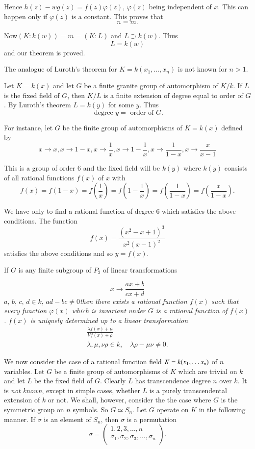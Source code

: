 Hence $h(z) - w g(z) =f(z) \varphi(z)$, $\varphi(z)$ being independent
of $x$. This can happen only if $\varphi(z)$ is a constant. This
proves that  
$$
n=m.
$$

Now\pageoriginale $(K:k(w))=m=(K:L)$ and $L \supset k(w)$. Thus 
$$
L = k(w)
$$
and our theorem is proved.

The analogue of Luroth's theorem for $K=k(x_1, \ldots, x_n)$ is not
known for $n >1$. 

Let $K=k(x)$ and let $G$ be a finite granite group of automorphism of
$K/k$. If $L$ is the fixed field of $G$, then $K/L$ is a finite
extension of degree equal to order of $G$. By Luroth's theorem $L=k(y)$
for some $y$. Thus 
$$
\text{ degree } y = \text{ order of } G.
$$

For instance, let $G$ be the finite group of automorphisms of $K=
k(x)$ defined by  
$$
x \to x, x\to 1-x,x \to \frac{1}{x}, x \to 1-\frac{1}{x},x \to
\frac{1}{1-x},x\to \frac{x}{x-1} 
$$

This is a group of order 6 and the fixed field will be $k(y)$ where
$k(y)$ consists of all rational functions $f(x)$ of $x$ with  
$$
f(x)= f(1-x)= f(\frac{1}{x}) = f(1-\frac{1}{x}) = f(\frac{1}{1-x}) =
f(\frac{x}{1-x}). 
$$

We have only to find a rational function of degree 6 which satisfies
the above conditions. The function  
$$
f(x)= \frac{(x^2-x+1)^3}{x^2(x-1)^2}
$$
satisfies the above conditions and so $y=f(x)$.

\begin{thm}\label{c3:thm14}%
If $G$ is any finite subgroup of $P_2$ of linear transformations 
\end{thm}
$$
x \to \frac{ax+b}{cx+d}
$$
$a$, $b$, $c$, $d \in k $, $ad - bc \neq 0$\pageoriginale \textit{then
  there exists a rational function $f(x)$ such that every function
  $\varphi(x)$ which is invariant under $G$ is a rational function
  of $f(x)$. $f(x)$ is uniquely determined up to a linear
  transformation}  
\begin{gather*}
\frac{\lambda f (x) + \mu }{ V f (x) + \rho}\\
\lambda, \mu, \nu  \rho \in k, \quad  \lambda \rho - \mu \nu \neq 0.
\end{gather*}

We now consider the case of a rational function field  $ K = k ( x_1,\break
\ldots x_n ) $ of $n$  variables. Let $G$ be a finite group of
automorphisms of $K$ which are trivial on  $k$ and let $L$ be the
fixed  field of $G$. Clearly $L$ has transcendence degree $n$ over
$k$. It is \textit{not known}, except in simple  cases, whether $L$
is  a purely transcendental extension of $k$ or not. We shall,
however, consider the  the case where $G$ is the symmetric group on
$n$ symbols. So $ G \simeq S_n $. Let $G$ operate on $K$ in the
following manner. If $ \sigma $ is an element of $ S_n$, then $ \sigma
$ is a permutation  
$$
 \sigma = \begin{pmatrix} 1,2,3,\ldots , n\\ \sigma_1, \sigma_2,
   \sigma_3, \ldots, \sigma_n \\  \end{pmatrix}. 
$$

